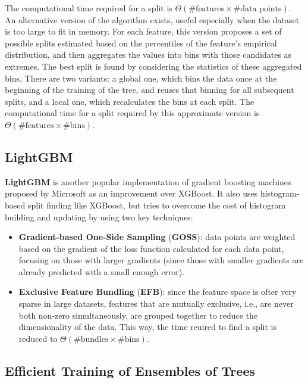 The computational time required for a split is $\Theta (\# \text{features} \times \# \text{data points})$. An alternative version of the algorithm exists, useful especially when the dataset is too large to fit in memory. For each feature, this version proposes a set of possible splits estimated based on the percentiles of the feature's empirical distribution, and then aggregates the values into bins with those candidates as extremes. The best split is found by considering the statistics of these aggregated bins. There are two variants: a global one, which bins the data once at the beginning of the training of the tree, and reuses that binning for all subsequent splits, and a local one, which recalculates the bins at each split. The computational time for a split required by this approximate version is $\Theta (\# \text{features} \times \# \text{bins})$.

\subsection{LightGBM}

\textbf{LightGBM} is another popular implementation of gradient boosting machines proposed by Microsoft as an improvement over XGBoost. It also uses histogram-based split finding like XGBoost, but tries to overcome the cost of histogram building and updating by using two key techniques:
\begin{itemize}
    \item \textbf{Gradient-based One-Side Sampling} (\textbf{GOSS}): data points are weighted based on the gradient of the loss function calculated for each data point, focusing on those with larger gradients (since those with smaller gradients are already predicted with a small enough error).

    \item \textbf{Exclusive Feature Bundling} (\textbf{EFB}): since the feature space is ofter very sparse in large datasets, features that are mutually exclusive, i.e., are never both non-zero simultaneously, are grouped together to reduce the dimensionality of the data. This way, the time reuired to find a split is reduced to $\Theta (\# \text{bundles} \times \# \text{bins})$.
\end{itemize}

\subsection{Efficient Training of Ensembles of Trees}

